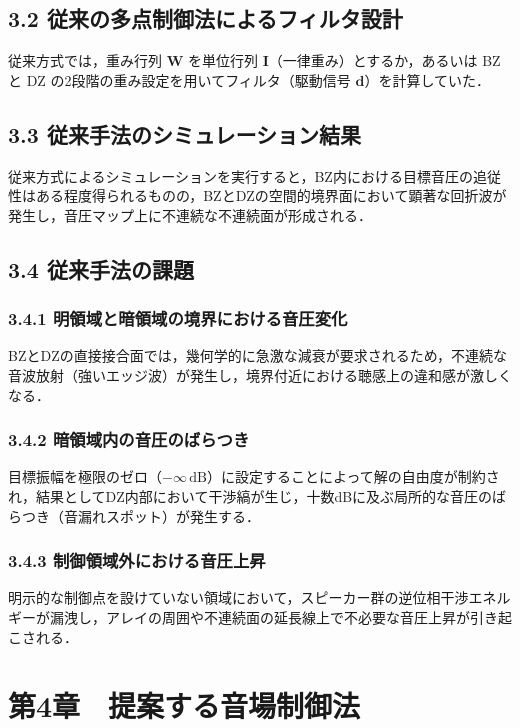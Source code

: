 \documentclass[11pt, a4paper]{article}
\begin{document}
\subsection{3.2 従来の多点制御法によるフィルタ設計}
従来方式では，重み行列 $\mathbf{W}$ を単位行列 $\mathbf{I}$（一律重み）とするか，あるいは BZ と DZ の2段階の重み設定を用いてフィルタ（駆動信号 $\mathbf{d}$）を計算していた．

\subsection{3.3 従来手法のシミュレーション結果}
従来方式によるシミュレーションを実行すると，BZ内における目標音圧の追従性はある程度得られるものの，BZとDZの空間的境界面において顕著な回折波が発生し，音圧マップ上に不連続な不連続面が形成される．

\subsection{3.4 従来手法の課題}
\subsubsection{3.4.1 明領域と暗領域の境界における音圧変化}
BZとDZの直接接合面では，幾何学的に急激な減衰が要求されるため，不連続な音波放射（強いエッジ波）が発生し，境界付近における聴感上の違和感が激しくなる．

\subsubsection{3.4.2 暗領域内の音圧のばらつき}
目標振幅を極限のゼロ（$-\infty\,\mathrm{dB}$）に設定することによって解の自由度が制約され，結果としてDZ内部において干渉縞が生じ，十数dBに及ぶ局所的な音圧のばらつき（音漏れスポット）が発生する．

\subsubsection{3.4.3 制御領域外における音圧上昇}
明示的な制御点を設けていない領域において，スピーカー群の逆位相干渉エネルギーが漏洩し，アレイの周囲や不連続面の延長線上で不必要な音圧上昇が引き起こされる．

\section{第4章　提案する音場制御法}
\end{document}
